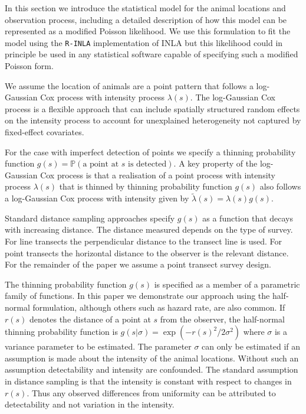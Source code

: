\documentclass[preprint,12pt]{elsarticle}
\newcommand{\tl}{\tilde{\lambda}}   %
\begin{document}
In this section we introduce the statistical model for the animal locations and observation process, including a detailed description of how this model can be represented as a modified Poisson likelihood.  We use this formulation to fit the model using the \texttt{R-INLA} implementation of INLA but this likelihood could in principle be used in any statistical software capable of specifying such a modified Poisson form.  

We assume the location of animals are a point pattern that follows a log-Gaussian Cox process with intensity process $\lambda(s)$.  The log-Gaussian Cox process is a flexible approach that can include spatially structured random effects on the intensity process to account for unexplained heterogeneity not captured by fixed-effect covariates.

\sloppy For the case with imperfect detection of points we specify a thinning probability function $g(s) = \mathbb{P}(\text{a point at $s$ is detected})$. A key property of the log-Gaussian Cox process is that a realisation of a point process with intensity process $\lambda(s)$ that is thinned by thinning probability function $g(s)$ also follows a log-Gaussian Cox process with intensity given by $\tl(s) = \lambda(s)g(s)$.

Standard distance sampling approaches specify $g(s)$ as a function that decays with increasing distance.  The distance measured depends on the type of survey.  For line transects the perpendicular distance to the transect line is used.  For point transects the horizontal distance to the observer is the relevant distance.  For the remainder of the paper we assume a point transect survey design.  

The thinning probability function $g(s)$ is specified as a member of a parametric family of functions.  In this paper we demonstrate our approach using the half-normal formulation, although others such as hazard rate, are also common.  If $r(s)$ denotes the distance of a point at $s$ from the observer, the half-normal thinning probability function is $g(s | \sigma) = \exp(-r(s)^2 / 2\sigma^2)$ where $\sigma$ is a variance parameter to be estimated.  The parameter $\sigma$ can only be estimated if an assumption is made about the intensity of the animal locations.  Without such an assumption detectability and intensity are confounded.  The standard assumption in distance sampling is that the intensity is constant with respect to changes in $r(s)$.  Thus any observed differences from uniformity can be attributed to detectability and not variation in the intensity.
\end{document}
